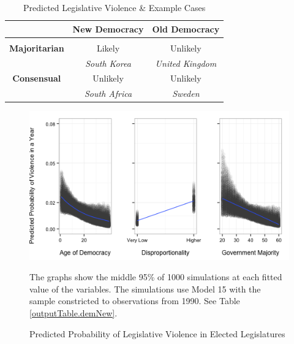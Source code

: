\documentclass[a4paper]{article}\usepackage{graphicx, color}
\newenvironment{knitrout}{}{} %
\begin{document}
\begin{table}[!h]
    \begin{center}
    \caption{Predicted Legislative Violence \& Example Cases}
    \label{leg.v.framework}
    \begin{tabular}{c | c c}
        
        & {\bf{New Democracy}} & {\bf{Old Democracy}} \\[0.25cm]
        \hline \\[0.25cm]
        {\bf{Majoritarian}} & Likely & Unlikely \\[0.25cm]
        & {\emph{South Korea}} & {\emph{United Kingdom}} \\[0.5cm]
        {\bf{Consensual}} & Unlikely & Unlikely \\[0.25cm]
         & {\emph{South Africa}} & {\emph{Sweden}} \\[0.25cm]
        \hline

    \end{tabular}
    \end{center}
\end{table}





\begin{figure}[t]
    \caption{Predicted Probability of Legislative Violence in Elected Legislatures}  
    \label{pred_prob}
    \begin{center}


\begin{knitrout}
\color{fgcolor}
\includegraphics[width=0.8\linewidth]{figure/predProb} 

\end{knitrout}

    \end{center}
    \begin{singlespace}
      {\scriptsize{The graphs show the middle 95\% of 1000 simulations at each fitted value of the variables. The simulations use Model 15 with the sample constricted to observations from 1990. See Table \ref{outputTable.demNew}.}}
    \end{singlespace}
\end{figure}
\end{document}
